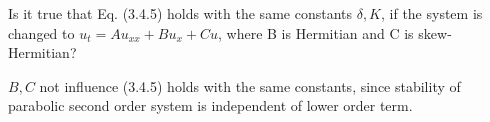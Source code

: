 \exc Is it true that Eq. (3.4.5) holds with the same 
constants $\delta ,K$, if the system
is changed to $u_t = Au_{xx} + Bu_{x} + Cu$, where B is Hermitian and C is
skew-Hermitian?


\begin{solution}
    $B, C$ not influence (3.4.5) holds with the same 
    constants, since stability of parabolic second 
    order system is independent of lower order term. 
\end{solution}